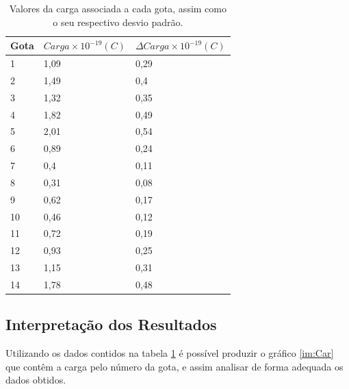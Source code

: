 \begin{table}[!htb]
\centering

\begin{tabular}{|l|ll|}
\hline
\rowcolor[HTML]{C0C0C0} 
Gota & $Carga \times 10^{-19} (C)$ & $\Delta Carga \times 10^{-19} (C)$ \\ \hline
1    & 1,09                        & 0,29                               \\ \hline
\rowcolor[HTML]{C0C0C0} 
2    & 1,49                        & 0,4                                \\ \hline
3    & 1,32                        & 0,35                               \\ \hline
\rowcolor[HTML]{C0C0C0} 
4    & 1,82                        & 0,49                               \\ \hline
5    & 2,01                        & 0,54                               \\ \hline
\rowcolor[HTML]{C0C0C0} 
6    & 0,89                        & 0,24                               \\ \hline
7    & 0,4                         & 0,11                               \\ \hline
\rowcolor[HTML]{C0C0C0} 
8    & 0,31                        & 0,08                               \\ \hline
9    & 0,62                        & 0,17                               \\ \hline
\rowcolor[HTML]{C0C0C0} 
10   & 0,46                        & 0,12                               \\ \hline
11   & 0,72                        & 0,19                               \\ \hline
\rowcolor[HTML]{C0C0C0} 
12   & 0,93                        & 0,25                               \\ \hline
13   & 1,15                        & 0,31                               \\ \hline
\rowcolor[HTML]{C0C0C0} 
14   & 1,78                        & 0,48                               \\ \hline
\end{tabular}
\caption{Valores da carga associada a cada gota, assim como o seu respectivo desvio padrão.}
\label{tab:Car}
\end{table}



\subsection{Interpretação dos Resultados}
Utilizando os dados contidos na tabela \ref{tab:Car} é possível produzir o gráfico \ref{im:Car} que contêm a carga pelo número da gota, e assim analisar de forma adequada os dados obtidos.

